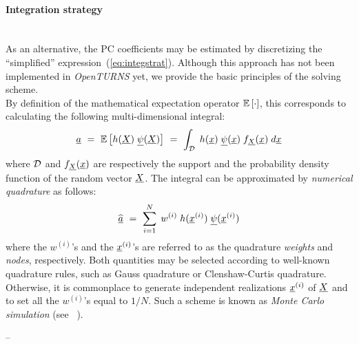 {  \paragraph*{Integration strategy \\ \\}

  As an alternative, the PC coefficients may be estimated by discretizing the ``simplified'' expression~(\ref{eq:integstrat}). Although this approach has not been implemented in \textit{OpenTURNS} yet, we provide the basic principles of the solving scheme. \\

  By definition of the mathematical expectation operator ${\mathbb E}\left[ \cdot \right]$, this corresponds to calculating the following multi-dimensional integral:
  \begin{equation} \label{eq:integstrat}
    \underline{a}  \, \, = \, \,  {\mathbb E}\left[ h({\underline{X}}) \; {\underline{\psi}}({\underline{X}}) \right] \, \, = \, \, \int_{{\mathcal D}} \; h({\underline{x}}) \; {\underline{\psi}}({\underline{x}}) \; f_{{\underline{X}}}({\underline{x}}) \; d{\underline{x}}
  \end{equation}
  where ${\mathcal D}$ and $f_{{\underline{X}}}({\underline{x}})$ are respectively the support and the probability density function of the random vector ${\underline{X}}$. The integral can be approximated by \emph{numerical quadrature} as follows:
  \begin{equation}
    \widehat{\underline{a}} \, \, = \, \, \sum_{i=1}^{N} \; w^{(i)}\; h({\underline{x}}^{(i)}) \; {\underline{\psi}}({\underline{x}}^{(i)})
  \end{equation}
  where the $w^{(i)}$'s and the ${\underline{x}}^{(i)}$'s are referred to as the quadrature \emph{weights} and \emph{nodes}, respectively. Both quantities may be selected according to well-known quadrature rules, such as Gauss quadrature or Clenshaw-Curtis quadrature. Otherwise, it is commonplace to generate independent realizations ${\underline{x}}^{(i)}$ of ${\underline{X}}$ and to set all the $w^{(i)}$'s equal to $1/N$. Such a scheme is known as \emph{Monte Carlo simulation} (see ~).
}
{--}

